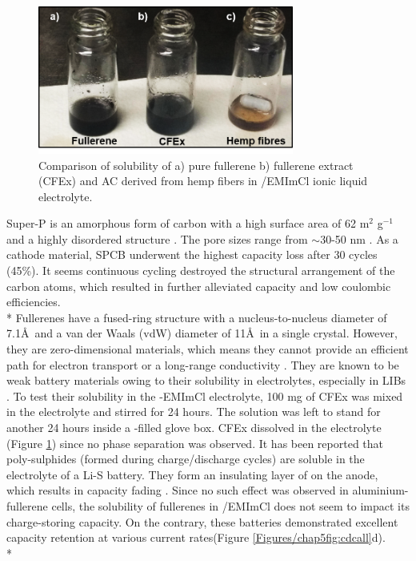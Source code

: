 \begin{figure}[h]
\centering
\includegraphics[width=0.75\textwidth]{Figures/chap5fig/cfexsol}
\caption{Comparison of solubility of a) pure  fullerene b) fullerene extract (CFEx) and AC derived from hemp fibers in /EMImCl ionic liquid electrolyte.}
\label{Figures/chap5fig:cfexsol}
\end{figure}

Super-P is an amorphous form of carbon with a high surface area of 62 m$^2$ g$^{-1}$ and a highly disordered structure \cite{see_reversible_2017}. The pore sizes range from $\sim$30-50 nm \cite{younesi_analysis_2015}. As a cathode material, SPCB underwent the highest capacity loss after 30 cycles (45\%). It seems continuous cycling destroyed the structural arrangement of the carbon atoms, which resulted in further alleviated capacity and low coulombic efficiencies.\\*
Fullerenes have a fused-ring structure with a nucleus-to-nucleus diameter of 7.1\AA\ and a van der Waals (vdW) diameter of 11\AA\ in a single crystal. However, they are zero-dimensional materials, which means they cannot provide an efficient path for electron transport or a long-range conductivity \cite{loutfy_fullerene_2002, winkler_two-component_2007}. They are known to be weak battery materials owing to their solubility in electrolytes, especially in LIBs \cite{seger_prospects_1991}. To test their solubility in the -EMImCl electrolyte, 100 mg of CFEx was mixed in the electrolyte and stirred for 24 hours. The solution was left to stand for another 24 hours inside a -filled glove box. CFEx dissolved in the electrolyte (Figure \ref{Figures/chap5fig:cfexsol}) since no phase separation was observed. It has been reported that poly-sulphides (formed during charge/discharge cycles) are soluble in the electrolyte of a Li-S battery. They form an insulating layer of  on the anode, which results in capacity fading \cite{sun_effect_2017}. Since no such effect was observed in aluminium-fullerene cells, the solubility of fullerenes in /EMImCl does not seem to impact its charge-storing capacity. On the contrary, these batteries demonstrated excellent capacity retention at various current rates(Figure \ref{Figures/chap5fig:cdcall}d).\\*

